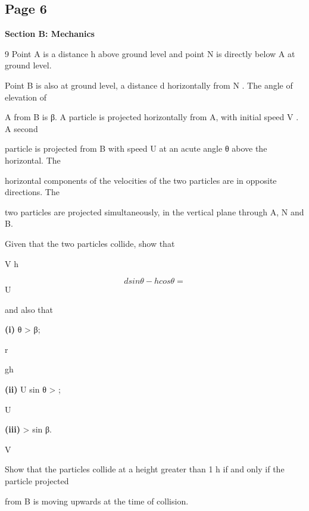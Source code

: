 \documentclass[12pt]{article}
\begin{document}
\subsection*{Page 6}
\begin{flushleft}
\bigskip\textbf{Section B: Mechanics}\par
9 Point A is a distance h above ground level and point N is directly below A at ground level.\par
Point B is also at ground level, a distance d horizontally from N . The angle of elevation of\par
A from B is β. A particle is projected horizontally from A, with initial speed V . A second\par
particle is projected from B with speed U at an acute angle θ above the horizontal. The\par
horizontal components of the velocities of the two particles are in opposite directions. The\par
two particles are projected simultaneously, in the vertical plane through A, N and B.\par
Given that the two particles collide, show that\par
V h\par
\[d sin θ - h cos θ =\]
U\par
and also that\par
\textbf{(i)} θ > β;\par
r\par
gh\par
\textbf{(ii)} U sin θ > ;\par
U\par
\textbf{(iii)} > sin β.\par
V\par
Show that the particles collide at a height greater than 1 h if and only if the particle projected\par
from B is moving upwards at the time of collision.\par
\end{flushleft}
\end{document}
